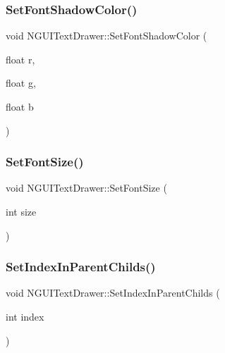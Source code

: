 \subsubsection{\texorpdfstring{Set\+Font\+Shadow\+Color()}{SetFontShadowColor()}}
{\footnotesize\ttfamily void N\+G\+U\+I\+Text\+Drawer\+::\+Set\+Font\+Shadow\+Color (\begin{DoxyParamCaption}\item[{float}]{r,  }\item[{float}]{g,  }\item[{float}]{b }\end{DoxyParamCaption})}

\hypertarget{class_n_g_u_i_text_drawer_a4cee05389aab41c9907e750d63133c4d}{}\label{class_n_g_u_i_text_drawer_a4cee05389aab41c9907e750d63133c4d} 
\subsubsection{\texorpdfstring{Set\+Font\+Size()}{SetFontSize()}}
{\footnotesize\ttfamily void N\+G\+U\+I\+Text\+Drawer\+::\+Set\+Font\+Size (\begin{DoxyParamCaption}\item[{int}]{size }\end{DoxyParamCaption})}

\hypertarget{class_n_g_u_i_text_drawer_a749cfea56538b59344a32c310db1796a}{}\label{class_n_g_u_i_text_drawer_a749cfea56538b59344a32c310db1796a} 
\subsubsection{\texorpdfstring{Set\+Index\+In\+Parent\+Childs()}{SetIndexInParentChilds()}}
{\footnotesize\ttfamily void N\+G\+U\+I\+Text\+Drawer\+::\+Set\+Index\+In\+Parent\+Childs (\begin{DoxyParamCaption}\item[{int}]{index }\end{DoxyParamCaption})}

\hypertarget{class_n_g_u_i_text_drawer_aaa874f4fdf507ec6fdefee0f5d93d3a7}{}\label{class_n_g_u_i_text_drawer_aaa874f4fdf507ec6fdefee0f5d93d3a7} 
